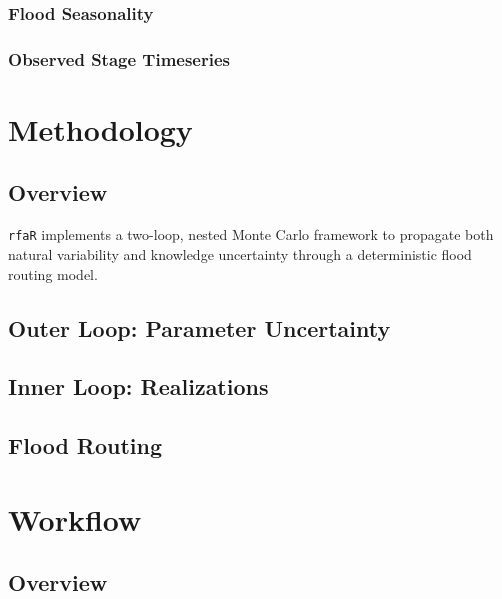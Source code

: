 \documentclass[
  letterpaper,
  DIV=11,
  numbers=noendperiod]{scrreprt}
\begin{document}
\subsection{Flood Seasonality}\label{flood-seasonality}

\subsection{Observed Stage Timeseries}\label{observed-stage-timeseries}


\chapter{Methodology}\label{methodology}

\section{Overview}\label{overview}

\texttt{rfaR} implements a two-loop, nested Monte Carlo framework to
propagate both natural variability and knowledge uncertainty through a
deterministic flood routing model.

\section{Outer Loop: Parameter
Uncertainty}\label{outer-loop-parameter-uncertainty}

\section{Inner Loop: Realizations}\label{inner-loop-realizations}

\section{Flood Routing}\label{flood-routing}


\chapter{Workflow}\label{workflow}

\section{Overview}\label{overview-1}
\end{document}
